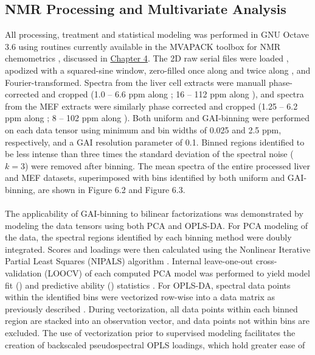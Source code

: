 \subsection{NMR Processing and Multivariate Analysis}

\begin{doublespace}
All processing, treatment and statistical modeling was performed in GNU Octave
3.6 \cite{eaton2008} using routines currently available in the MVAPACK
toolbox for NMR chemometrics \cite{worley:acscb2014}, discussed in
\hyperlink{chapter.4}{Chapter 4}. The 2D raw serial files were loaded
\cite{delaglio:jbnmr1995}, apodized with a squared-sine window,
zero-filled once along \hnmr{} and twice along \cnmr{}, and
Fourier-transformed. Spectra from the liver cell extracts were manuall
phase-corrected and cropped (1.0 -- 6.6 ppm along \hnmr{}; 16 -- 112 ppm
along \cnmr{}), and spectra from the MEF extracts were similarly phase
corrected and cropped (1.25 -- 6.2 ppm along \hnmr{}; 8 -- 102 ppm
along \cnmr{}). Both uniform and GAI-binning were performed on each data tensor
using minimum \hnmr{} and \cnmr{} bin widths of 0.025 and 2.5
ppm, respectively, and a GAI resolution parameter of 0.1. Binned regions
identified to be less intense than three times the standard deviation of the
spectral noise ($k = 3$) were removed after binning. The mean spectra of the
entire processed liver and MEF datasets, superimposed with bins identified by
both uniform and GAI-binning, are shown in Figure 6.2 and Figure 6.3.
\\\\
The applicability of GAI-binning to bilinear factorizations was demonstrated
by modeling the data tensors using both PCA and OPLS-DA. For PCA modeling of
the data, the spectral regions identified by each binning method were doubly
integrated. Scores and loadings were then calculated using the Nonlinear
Iterative Partial Least Squares (NIPALS) algorithm
\cite{jolliffe2002}. Internal leave-one-out cross-validation (LOOCV)
of each computed PCA model was performed to yield model fit (\rsqx{}) and
predictive ability (\qsq{}) statistics
\cite{krzanowski:biom1987,eshghi:cils2014}. For OPLS-DA, spectral data
points within the identified bins were vectorized row-wise into a data matrix
as previously described \cite{hedenstrom:cils2008}. During
vectorization, all data points within each binned region are stacked into an
observation vector, and data points not within bins are excluded. The use of
vectorization prior to supervised modeling facilitates the creation of
backscaled pseudospectral OPLS loadings, which hold greater ease of

\end{doublespace}
